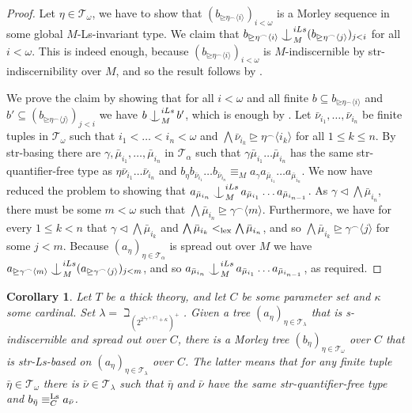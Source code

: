 \documentclass[a4paper, reqno]{amsart}
\newtheorem{corollary}[theorem]{Corollary}
\theoremstyle{definition}
\theoremstyle{repeat}
\newcommand{\T}{\mathcal{T}}
\newcommand{\equivls}{\equiv^\textup{Ls}}
\newcommand{\lex}{{\textup{lex}}}
\def\Ind#1#2{#1\setbox0=\hbox{$#1x$}\kern\wd0\hbox to 0pt{\hss$#1\mid$\hss}
\lower.9\ht0\hbox to 0pt{\hss$#1\smile$\hss}\kern\wd0}
\def\ind{\mathop{\mathpalette\Ind{}}}
\begin{document}
\begin{proof}
Let $\eta \in \T_\omega$, we have to show that $(b_{\unrhd \eta^\frown \langle i \rangle})_{i < \omega}$ is a Morley sequence in some global $M$-Ls-invariant type. We claim that $b_{\unrhd \eta^\frown \langle i \rangle} \ind^{iLs}_M (b_{\unrhd \eta^\frown \langle j \rangle})_{j < i}$ for all $i < \omega$. This is indeed enough, because $(b_{\unrhd \eta^\frown \langle i \rangle})_{i < \omega}$ is $M$-indiscernible by str-indiscernibility over $M$, and so the result follows by .

We prove the claim by showing that for all $i < \omega$ and all finite $b \subseteq b_{\unrhd \eta^\frown \langle i \rangle}$ and $b' \subseteq (b_{\unrhd \eta^\frown \langle j \rangle})_{j < i}$ we have $b \ind^{iLs}_M b'$, which is enough by . Let $\bar{\nu}_{i_1}, \ldots, \bar{\nu}_{i_n}$ be finite tuples in $\T_\omega$ such that $i_1 < \ldots < i_n < \omega$ and $\bigwedge \bar{\nu}_{i_k} \unrhd \eta^\frown \langle i_k \rangle$ for all $1 \leq k \leq n$. By str-basing there are $\gamma, \bar{\mu}_{i_1}, \ldots, \bar{\mu}_{i_n}$ in $\T_\alpha$ such that $\gamma \bar{\mu}_{i_1} \ldots \bar{\mu}_{i_n}$ has the same str-quantifier-free type as $\eta \bar{\nu}_{i_1} \ldots \bar{\nu}_{i_n}$ and $b_{\eta} b_{\bar{\nu}_{i_1}} \ldots b_{\bar{\nu}_{i_n}} \equiv_M a_\gamma a_{\bar{\mu}_{i_1}} \ldots a_{\bar{\mu}_{i_n}}$. We now have reduced the problem to showing that $a_{\bar{\mu}_{i_n}} \ind^{iLs}_M a_{\bar{\mu}_{i_1}} \ldots a_{\bar{\mu}_{i_{n-1}}}$. As $\gamma \lhd \bigwedge \bar{\mu}_{i_n}$, there must be some $m < \omega$ such that $\bigwedge \bar{\mu}_{i_n} \unrhd \gamma^\frown \langle m \rangle$. Furthermore, we have for every $1 \leq k < n$ that $\gamma \lhd \bigwedge \bar{\mu}_{i_k}$ and $\bigwedge \bar{\mu}_{i_k} <_\lex \bigwedge \bar{\mu}_{i_n}$, and so $\bigwedge \bar{\mu}_{i_k} \unrhd \gamma^\frown \langle j \rangle$ for some $j < m$. Because $(a_\eta)_{\eta \in \T_\alpha}$ is spread out over $M$ we have $a_{\unrhd \gamma^\frown \langle m \rangle} \ind^{iLs}_M (a_{\unrhd \gamma^\frown \langle j \rangle})_{j < m}$, and so $a_{\bar{\mu}_{i_n}} \ind^{iLs}_M a_{\bar{\mu}_{i_1}} \ldots a_{\bar{\mu}_{i_{n-1}}}$, as required.
\end{proof}
\begin{corollary}
Let $T$ be a thick theory, and let $C$ be some parameter set and $\kappa$ some cardinal. Set $\lambda = \beth_{\left( 2^{2^{\lambda_T + |C|} + \kappa} \right)^+}$. Given a tree $(a_\eta)_{\eta \in \T_\lambda}$ that is s-indiscernible and spread out over $C$, there is a Morley tree $(b_\eta)_{\eta \in \T_\omega}$ over $C$ that is str-Ls-based on $(a_\eta)_{\eta \in \T_\lambda}$ over $C$. The latter means that for any finite tuple $\bar{\eta} \in \T_\omega$ there is $\bar{\nu} \in \T_\lambda$ such that $\bar{\eta}$ and $\bar{\nu}$ have the same str-quantifier-free type and $b_{\bar{\eta}} \equivls_C a_{\bar{\nu}}$.
\end{corollary}
\end{document}
